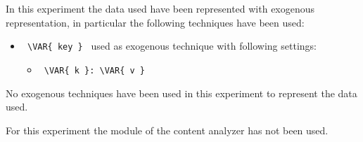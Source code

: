 

In this experiment the data used have been represented with exogenous representation, in particular the
following techniques have been used:
\begin{itemize}
    \item
     \verb| \VAR{ key } | used as exogenous technique with following settings:
     \begin{itemize}
             \item
             \verb| \VAR{ k }: \VAR{ v }|
     \end{itemize}
\end{itemize}
No exogenous techniques have been used in this experiment to represent the data used.




For this experiment the module of the content analyzer has not been used.
\hfill\break
\hfill\break

